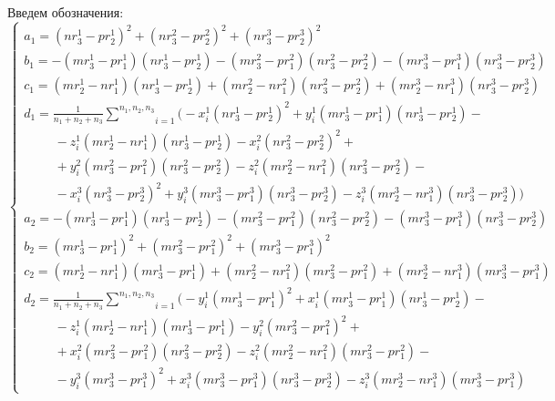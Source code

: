Введем обозначения:
$$\begin{cases}
	a_1 = (n r_3^1 - p r_2^1)^2 + (n r_3^2 - p r_2^2)^2 + (n r_3^3 - p r_2^3)^2 \\
	b_1 = -(m r_3^1 - p r_1^1) (n r_3^1 - p r_2^1) - (m r_3^2 - p r_1^2) (n r_3^2 - p r_2^2) - (m r_3^3 - p r_1^3) (n r_3^3 - p r_2^3) \\
	c_1 = (m r_2^1 - n r_1^1) (n r_3^1 - p r_2^1) + (m r_2^2 - n r_1^2) (n r_3^2 - p r_2^2) + (m r_2^3 - n r_1^3) (n r_3^3 - p r_2^3) \\
	d_1 = \frac{1}{n_1+n_2+n_3} \underset{i=1}{\overset{n_1, n_2, n_3}{\sum}} \bigg( 
		- x_i^1 (n r_3^1 - p r_2^1)^2 +
		y_i^1 (m r_3^1 - p r_1^1) (n r_3^1 - p r_2^1) - \\
		\hspace{1cm} - z_i^1  (m r_2^1 - n r_1^1) (n r_3^1 - p r_2^1) - 
		x_i^2 (n r_3^2 - p r_2^2)^2 + \\
		\hspace{1cm} + y_i^2  (m r_3^2 - p r_1^2) (n r_3^2 - p r_2^2) -
		z_i^2 (m r_2^2 - n r_1^2) (n r_3^2 - p r_2^2) - \\
		\hspace{1cm} - x_i^3 (n r_3^3 - p r_2^3)^2 +
		y_i^3 (m r_3^3 - p r_1^3) (n r_3^3 - p r_2^3) -
		z_i^3 (m r_2^3 - n r_1^3) (n r_3^3 - p r_2^3)
	 \bigg) \\
	a_2 = -(m r_3^1 - p r_1^1) (n r_3^1 - p r_2^1) - (m r_3^2 - p r_1^2) (n r_3^2 - p r_2^2) - (m r_3^3 - p r_1^3) (n r_3^3 - p r_2^3) \\
	b_2 = (m r_3^1 - p r_1^1)^2 + (m r_3^2 - p r_1^2)^2 + (m r_3^3 - p r_1^3)^2 \\
	c_2 = (m r_2^1 - n r_1^1) (m r_3^1 - p r_1^1) + (m r_2^2 - n r_1^2) (m r_3^2 - p r_1^2) + (m r_2^3 - n r_1^3) (m r_3^3 - p r_1^3) \\
	d_2 = \frac{1}{n_1+n_2+n_3} \underset{i=1}{\overset{n_1, n_2, n_3}{\sum}} \bigg( 
		- y_i^1 (m r_3^1 - p r_1^1)^2
		+ x_i^1 (m r_3^1 - p r_1^1) (n r_3^1 - p r_2^1) - \\
		\hspace{1cm} - z_i^1  (m r_2^1 - n r_1^1) (m r_3^1 - p r_1^1)
		- y_i^2 (m r_3^2 - p r_1^2)^2 + \\
		\hspace{1cm} + x_i^2  (m r_3^2 - p r_1^2) (n r_3^2 - p r_2^2)
		- z_i^2 (m r_2^2 - n r_1^2) (m r_3^2 - p r_1^2) - \\
		\hspace{1cm} - y_i^3 (m r_3^3 - p r_1^3)^2
		+ x_i^3 (m r_3^3 - p r_1^3) (n r_3^3 - p r_2^3)
		- z_i^3 (m r_2^3 - n r_1^3) (m r_3^3 - p r_1^3)

\end{cases}$$
